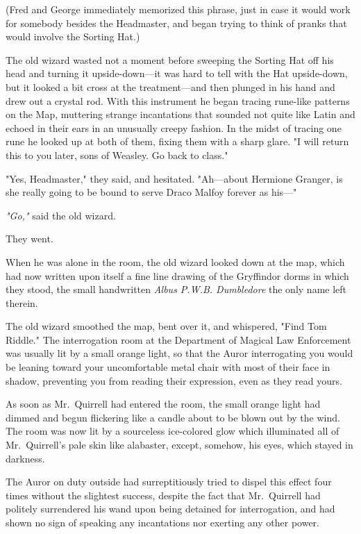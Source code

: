 (Fred and George immediately memorized this phrase, just in case it would work
for somebody besides the Headmaster, and began trying to think of pranks that
would involve the Sorting Hat.)

The old wizard wasted not a moment before sweeping the Sorting Hat off his head
and turning it upside-down---it was hard to tell with the Hat upside-down, but
it looked a bit cross at the treatment---and then plunged in his hand and drew
out a crystal rod. With this instrument he began tracing rune-like patterns on
the Map, muttering strange incantations that sounded not quite like Latin and
echoed in their ears in an unusually creepy fashion. In the midst of tracing
one rune he looked up at both of them, fixing them with a sharp glare. "I will
return this to you later, sons of Weasley. Go back to class."

"Yes, Headmaster," they said, and hesitated. "Ah---about Hermione Granger, is
she really going to be bound to serve Draco Malfoy forever as his\mbox{---}"

\emph{"Go,"} said the old wizard.

They went.

When he was alone in the room, the old wizard looked down at the map, which had
now written upon itself a fine line drawing of the Gryffindor dorms in which
they stood, the small handwritten \emph{Albus P.W.B. Dumbledore} the only name
left therein.

The old wizard smoothed the map, bent over it, and whispered, "Find Tom Riddle."
\sbreak
The interrogation room at the Department of Magical Law Enforcement was usually
lit by a small orange light, so that the Auror interrogating you would be
leaning toward your uncomfortable metal chair with most of their face in
shadow, preventing you from reading their expression, even as they read yours.

As soon as Mr.~Quirrell had entered the room, the small orange light had dimmed
and begun flickering like a candle about to be blown out by the wind. The room
was now lit by a sourceless ice-colored glow which illuminated all of
Mr.~Quirrell's pale skin like alabaster, except, somehow, his eyes, which
stayed in darkness.

The Auror on duty outside had surreptitiously tried to dispel this effect four
times without the slightest success, despite the fact that Mr.~Quirrell had
politely surrendered his wand upon being detained for interrogation, and had
shown no sign of speaking any incantations nor exerting any other power.

